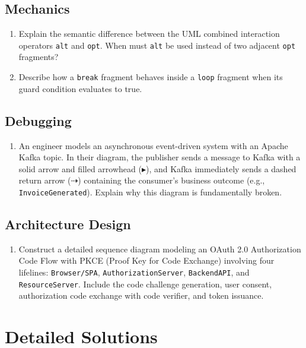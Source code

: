 \subsection*{Mechanics}
\begin{enumerate}[leftmargin=18pt]
  \item Explain the semantic difference between the UML combined interaction operators \texttt{alt} and \texttt{opt}. When must \texttt{alt} be used instead of two adjacent \texttt{opt} fragments?
  \item Describe how a \texttt{break} fragment behaves inside a \texttt{loop} fragment when its guard condition evaluates to true.
\end{enumerate}

\subsection*{Debugging}
\begin{enumerate}[leftmargin=18pt]
  \item An engineer models an asynchronous event-driven system with an Apache Kafka topic. In their diagram, the publisher sends a message to Kafka with a solid arrow and filled arrowhead ($\blacktriangleright$), and Kafka immediately sends a dashed return arrow ($\dashrightarrow$) containing the consumer's business outcome (e.g., \texttt{InvoiceGenerated}). Explain why this diagram is fundamentally broken.
\end{enumerate}

\subsection*{Architecture Design}
\begin{enumerate}[leftmargin=18pt]
  \item Construct a detailed sequence diagram modeling an OAuth 2.0 Authorization Code Flow with PKCE (Proof Key for Code Exchange) involving four lifelines: \texttt{Browser/SPA}, \texttt{AuthorizationServer}, \texttt{BackendAPI}, and \texttt{ResourceServer}. Include the code challenge generation, user consent, authorization code exchange with code verifier, and token issuance.
\end{enumerate}

\section{Detailed Solutions}

